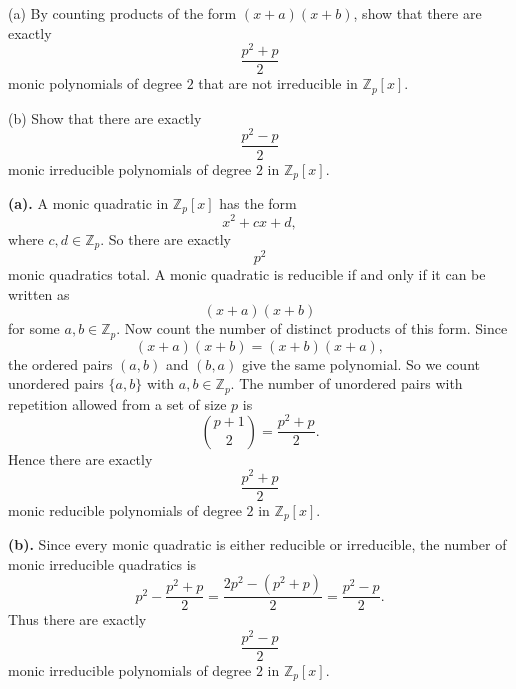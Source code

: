 \begin{problem}{
    (a) By counting products of the form $(x+a)(x+b)$, show that there are exactly
    \[
        \frac{p^2+p}{2}
    \]
    monic polynomials of degree $2$ that are not irreducible in $\mathbb{Z}_p[x]$.

    (b) Show that there are exactly
    \[
        \frac{p^2-p}{2}
    \]
    monic irreducible polynomials of degree $2$ in $\mathbb{Z}_p[x]$.
}
    \textbf{(a).}
    A monic quadratic in $\mathbb{Z}_p[x]$ has the form
    \[
        x^2+cx+d,
    \]
    where $c,d\in\mathbb{Z}_p$.
    So there are exactly
    \[
        p^2
    \]
    monic quadratics total.
    A monic quadratic is reducible if and only if it can be written as
    \[
        (x+a)(x+b)
    \]
    for some $a,b\in\mathbb{Z}_p$.
    Now count the number of distinct products of this form.
    Since
    \[
        (x+a)(x+b)=(x+b)(x+a),
    \]
    the ordered pairs $(a,b)$ and $(b,a)$ give the same polynomial.
    So we count unordered pairs $\{a,b\}$ with $a,b\in\mathbb{Z}_p$.
    The number of unordered pairs with repetition allowed from a set of size $p$ is
    \[
        \binom{p+1}{2}=\frac{p^2+p}{2}.
    \]
    Hence there are exactly
    \[
        \frac{p^2+p}{2}
    \]
    monic reducible polynomials of degree $2$ in $\mathbb{Z}_p[x]$.

    \textbf{(b).}
    Since every monic quadratic is either reducible or irreducible, the number of monic irreducible quadratics is
    \[
        p^2-\frac{p^2+p}{2}
        =
        \frac{2p^2-(p^2+p)}{2}
        =
        \frac{p^2-p}{2}.
    \]
    Thus there are exactly
    \[
        \frac{p^2-p}{2}
    \]
    monic irreducible polynomials of degree $2$ in $\mathbb{Z}_p[x]$.
\end{problem}

